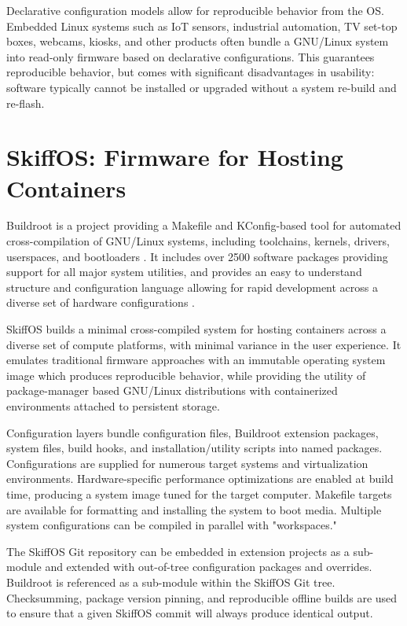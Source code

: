 \documentclass[english,]{IEEEtran}
\begin{document}
Declarative configuration models allow for reproducible behavior from
the OS. Embedded Linux systems such as IoT sensors, industrial
automation, TV set-top boxes, webcams, kiosks, and other products often
bundle a GNU/Linux system into read-only firmware based on declarative
configurations. This guarantees reproducible behavior, but comes with
significant disadvantages in usability: software typically cannot be
installed or upgraded without a system re-build and re-flash.

\hypertarget{skiffos-firmware-for-hosting-containers}{%
\section{SkiffOS: Firmware for Hosting
Containers}\label{skiffos-firmware-for-hosting-containers}}

Buildroot is a project providing a Makefile and KConfig-based tool for
automated cross-compilation of GNU/Linux systems, including toolchains,
kernels, drivers, userspaces, and bootloaders \autocite{buildroot}. It
includes over 2500 software packages providing support for all major
system utilities, and provides an easy to understand structure and
configuration language allowing for rapid development across a diverse
set of hardware configurations \autocite{buildrootrt}.

SkiffOS builds a minimal cross-compiled system for hosting containers
across a diverse set of compute platforms, with minimal variance in the
user experience. It emulates traditional firmware approaches with an
immutable operating system image which produces reproducible behavior,
while providing the utility of package-manager based GNU/Linux
distributions with containerized environments attached to persistent
storage.

Configuration layers bundle configuration files, Buildroot extension
packages, system files, build hooks, and installation/utility scripts
into named packages. Configurations are supplied for numerous target
systems and virtualization environments. Hardware-specific performance
optimizations are enabled at build time, producing a system image tuned
for the target computer. Makefile targets are available for formatting
and installing the system to boot media. Multiple system configurations
can be compiled in parallel with "workspaces."

The SkiffOS Git repository can be embedded in extension projects as a
sub-module and extended with out-of-tree configuration packages and
overrides. Buildroot is referenced as a sub-module within the SkiffOS
Git tree. Checksumming, package version pinning, and reproducible
offline builds are used to ensure that a given SkiffOS commit will
always produce identical output.
\end{document}
